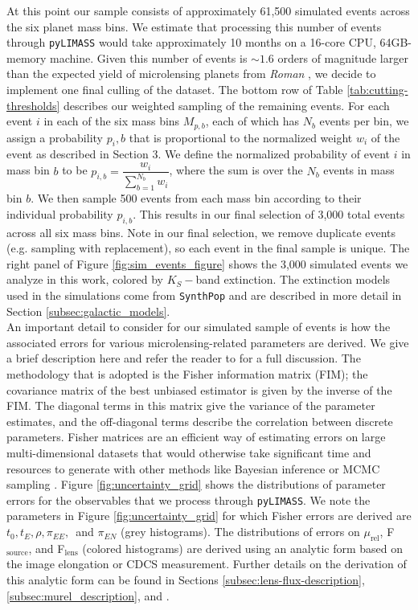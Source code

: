 \documentclass[twocolumn]{aastex631}
\begin{document}
\indent At this point our sample consists of approximately 61,500 simulated events across the six planet mass bins. We estimate that processing this number of events through \texttt{pyLIMASS} would take approximately 10 months on a 16-core CPU, 64GB-memory machine. Given this number of events is ${\sim} 1.6$ orders of magnitude larger than the expected yield of microlensing planets from \textit{Roman} \citep{penny19, zohrabi:inprep}, we decide to implement one final culling of the dataset. The bottom row of Table \ref{tab:cutting-thresholds} describes our weighted sampling of the remaining events. For each event $i$ in each of the six mass bins $M_{p,b}$, each of which has $N_b$ events per bin, we assign a probability $p_i,b$ that is proportional to the normalized weight $w_i$ of the event as described in Section 3. We define the normalized probability of event $i$ in mass bin $b$ to be $p_{i,b} = \dfrac{w_i}{\sum_{b=1}^{N_b} w_i}$,  where the sum is over the $N_b$ events in mass bin $b$.  We then sample 500 events from each mass bin according to their individual probability $p_{i,b}$. This results in our final selection of 3,000 total events across all six mass bins. Note in our final selection, we remove duplicate events (e.g. sampling with replacement), so each event in the final sample is unique. The right panel of Figure \ref{fig:sim_events_figure} shows the 3,000 simulated events we analyze in this work, colored by $K_S-$band extinction. The extinction models used in the simulations come from \texttt{SynthPop} and are described in more detail in Section \ref{subsec:galactic_models}. \\
\indent An important detail to consider for our simulated sample of events is how the associated errors for various microlensing-related parameters are derived. We give a brief description here and refer the reader to \cite{zohrabi:inprep} for a full discussion. The methodology that is adopted is the Fisher information matrix (FIM); the covariance matrix of the best unbiased estimator is given by the inverse of the FIM. The diagonal terms in this matrix give the variance of the parameter estimates, and the off-diagonal terms describe the correlation between discrete parameters. Fisher matrices are an efficient way of estimating errors on large multi-dimensional datasets that would otherwise take significant time and resources to generate with other methods like Bayesian inference or MCMC sampling \citep{rodriguez:2013a}. Figure \ref{fig:uncertainty_grid} shows the distributions of parameter errors for the observables that we process through \texttt{pyLIMASS}. We note the parameters in Figure \ref{fig:uncertainty_grid} for which Fisher errors are derived are $t_0, t_E,\rho,\pi_{EE},$\, and $\pi_{EN}$ (grey histograms). The distributions of errors on $\mu_{\textrm{rel}}$, F$_{\textrm{source}}$, and F$_{\textrm{lens}}$ (colored histograms) are derived using an analytic form based on the image elongation or CDCS measurement. Further details on the derivation of this analytic form can be found in Sections \ref{subsec:lens-flux-description}, \ref{subsec:murel_description}, and \cite{verma:inprep}. \\
\end{document}
